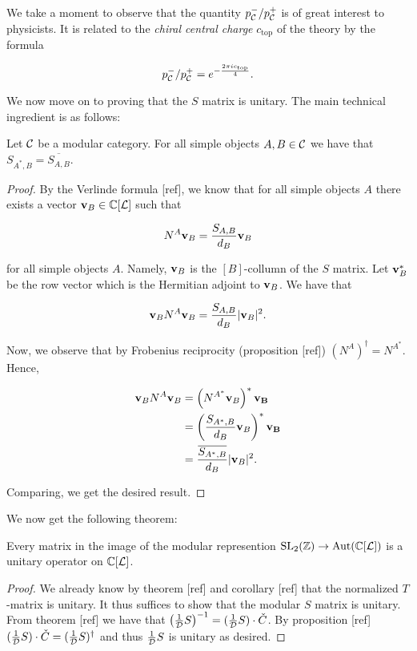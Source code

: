 We take a moment to observe that the quantity $p_{{\mathcal C}}^-/p_{{\mathcal C}}^+$ is of great interest to physicists. It is related to the \textit{chiral central charge} $c_{\text{top}}$ of the theory by the formula

$$p_{{\mathcal C}}^-/p_{{\mathcal C}}^{+}=e^{-\frac{2\pi i c_{\text{top}}}{4}}.$$


We now move on to proving that the $S$ matrix is unitary. The main technical ingredient is as follows:

\begin{prop} Let ${\mathcal C}$ be a modular category. For all simple objects $A,B\in {\mathcal C}$ we have that $S_{A^*,B}=\overline{S_{A,B}}$.
\end{prop}
\begin{proof} By the Verlinde formula [ref], we know that for all simple objects $A$ there exists a vector $\bold{v}_B\in {\mathbb C}[{\mathcal L}]$ such that

$$N^{A} \bold{v}_B= \frac{S_{A,B}}{d_B}\bold{v}_B$$

for all simple objects $A$. Namely, $\bold{v}_B$ is the $[B]$-collumn of the $S$ matrix. Let $\bold{v}_B^{*}$ be the row vector which is the Hermitian adjoint to $\bold{v}_B$. We have that

$$\bold{v}_{B}N^{A}\bold{v}_B=\frac{S_{A,B}}{d_B}|\bold{v}_B|^2.$$

Now, we observe that by Frobenius reciprocity (proposition [ref]) $(N^{A})^{\dagger}=N^{A^*}$. Hence,

\begin{align*}
\bold{v}_{B}N^{A}\bold{v}_B&=\left(N^{A^*}\bold{v}_B\right)^*\bold{v_B}\\
&=\left(\frac{S_{A^*,B}}{d_B}\bold{v}_B\right)^*\bold{v_B}\\
&=\frac{\overline{S_{A^*,B}}}{d_B}|\bold{v}_B|^2.
\end{align*}

Comparing, we get the desired result.

\end{proof}

We now get the following theorem:

\begin{thrm} Every matrix in the image of the modular represention $\operatorname{SL}_2({\mathbb Z})\to \operatorname{Aut}({\mathbb C}[{\mathcal L}])$ is a unitary operator on ${\mathbb C}[{\mathcal L}]$.
\end{thrm}
\begin{proof} We already know by theorem [ref] and corollary [ref] that the normalized $T$-matrix is unitary. It thus suffices to show that the modular $S$ matrix is unitary. From theorem [ref] we have that $\left(\frac{1}{{\mathcal D}}S\right)^{-1} = (\frac{1}{{\mathcal D}}S) \cdot {\check C}$. By proposition [ref] $(\frac{1}{{\mathcal D}}S) \cdot {\check C} = (\frac{1}{{\mathcal D}}S)^{\dagger}$ and thus $\frac{1}{{\mathcal D}}S$ is unitary as desired.
\end{proof}

